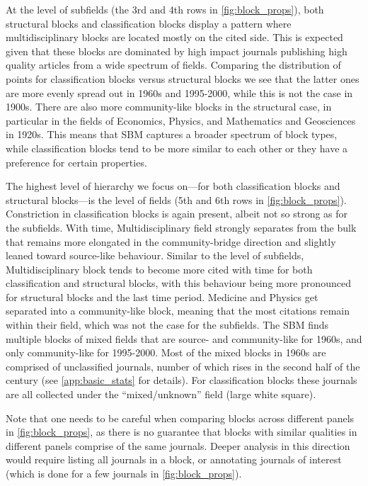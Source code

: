 \documentclass[a4paper,12pt]{article}
\begin{document}
At the level of subfields (the 3rd and 4th rows in \cref{fig:block_props}), both structural blocks and classification blocks display a pattern
where multidisciplinary blocks are located mostly on the cited side.
This is expected given that 
these blocks are dominated by high impact journals publishing high quality articles from a wide 
spectrum of fields. Comparing the distribution of points for classification blocks versus
structural blocks we see that the latter ones are more evenly spread out in 1960s 
and 1995-2000, while this is not the case in 1900s. 
There are also more community-like blocks 
in the structural case, in particular in the fields of Economics, Physics, and 
Mathematics and Geosciences in 1920s. This means that SBM captures a broader 
spectrum of block types, while classification blocks tend to be more similar to each other or
they have a preference for certain properties.

The highest level of hierarchy we focus on---for both classification blocks and structural blocks---is the level of fields
(5th and 6th rows in \cref{fig:block_props}).
Constriction in classification blocks is again present, albeit not so strong as for the 
subfields. With time, Multidisciplinary field strongly separates from the bulk that remains more elongated in the community-bridge direction and slightly leaned toward 
source-like behaviour. 
Similar to the level of subfields, Multidisciplinary block tends to become more cited with 
time for both classification and structural blocks, with this behaviour being more pronounced for 
structural blocks and the last time period.
Medicine and Physics get separated into a community-like block, meaning that the
most citations remain within their field, which was not the case for the subfields. The SBM finds
multiple blocks of mixed fields that are source- and community-like for 1960s, and only community-like for 1995-2000. Most of the mixed blocks in 1960s are 
comprised of unclassified journals, number of which rises in the second half of the century
(see \cref{app:basic_stats} for details). For classification blocks these journals are all collected under 
the ``mixed/unknown'' field (large white square).



Note that one needs to be careful when comparing blocks across different panels in \cref{fig:block_props}, as there 
is no guarantee that blocks with similar qualities in different panels comprise of the same journals. Deeper analysis in 
this direction would require listing all journals in a block, or annotating journals 
of interest (which is done for a few journals in \cref{fig:block_props}).
\end{document}
